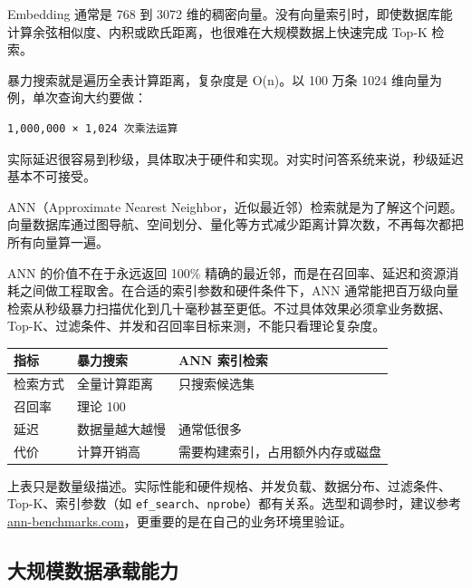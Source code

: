 \documentclass[10pt,a4paper]{ctexart}
\begin{document}
Embedding 通常是 768 到 3072 维的稠密向量。没有向量索引时，即使数据库能计算余弦相似度、内积或欧氏距离，也很难在大规模数据上快速完成 Top-K 检索。



暴力搜索就是遍历全表计算距离，复杂度是 O(n)。以 100 万条 1024 维向量为例，单次查询大约要做：



\begin{lstlisting}
1,000,000 × 1,024 次乘法运算
\end{lstlisting}



实际延迟很容易到秒级，具体取决于硬件和实现。对实时问答系统来说，秒级延迟基本不可接受。



ANN（Approximate Nearest Neighbor，近似最近邻）检索就是为了解这个问题。向量数据库通过图导航、空间划分、量化等方式减少距离计算次数，不再每次都把所有向量算一遍。



ANN 的价值不在于永远返回 100\% 精确的最近邻，而是在召回率、延迟和资源消耗之间做工程取舍。在合适的索引参数和硬件条件下，ANN 通常能把百万级向量检索从秒级暴力扫描优化到几十毫秒甚至更低。不过具体效果必须拿业务数据、Top-K、过滤条件、并发和召回率目标来测，不能只看理论复杂度。


{\footnotesize
\begin{tabularx}{\textwidth}{|X|X|X|}
\hline
\textbf{指标} & \textbf{暴力搜索} & \textbf{ANN 索引检索} \\
\hline
检索方式 & 全量计算距离 & 只搜索候选集 \\
\hline
召回率 & 理论 100\\%
\hline
延迟 & 数据量越大越慢 & 通常低很多 \\
\hline
代价 & 计算开销高 & 需要构建索引，占用额外内存或磁盘 \\
\hline
\end{tabularx}
}



上表只是数量级描述。实际性能和硬件规格、并发负载、数据分布、过滤条件、Top-K、索引参数（如 \texttt{ef\_search}、\texttt{nprobe}）都有关系。选型和调参时，建议参考 \href{https://ann-benchmarks.com/}{ann-benchmarks.com}，更重要的是在自己的业务环境里验证。



\subsection{大规模数据承载能力}
\end{document}
